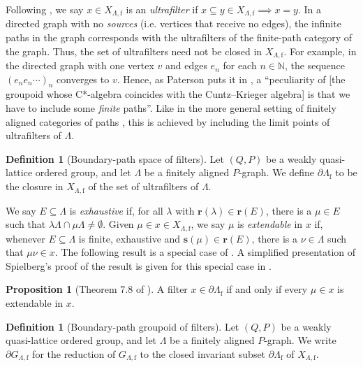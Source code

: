 \documentclass[11pt]{amsart}
\theoremstyle{definition}
\numberwithin{thm}{section}
\numberwithin{equation}{section}
\newtheorem{definition}[thm]{Definition}
\newtheorem{proposition}[thm]{Proposition}
\newcommand{\Define}[1]{\emph{#1}}
\newcommand{\emphasis}[1]{\textit{#1}}
\newcommand{\N}{\mathbb{N}}
\newcommand{\range}{\mathbf{r}}
\newcommand{\source}{\mathbf{s}}
\newcommand{\F}{\mathrm{f}}
\newcommand{\PS}[2]{X_{#2, #1}}
\newcommand{\PG}[2]{{G_{#2, #1}}}
\newcommand{\BPS}[2]{\partial{#2}_{#1}}
\newcommand{\BPG}[2]{\partial\PG{#1}{#2}}
\begin{document}
Following \cite{BSV13}, we say $x \in \PS{\F}{\Lambda}$ is an \Define{ultrafilter} if $x \subseteq y \in \PS{\F}{\Lambda} \implies x = y$. 
In a directed graph with no \Define{sources} (i.e. vertices that receive no edges), the infinite paths in the graph corresponds with the ultrafilters of the finite-path category of the graph. 
Thus, the set of ultrafilters need not be closed in $\PS{\F}{\Lambda}$. 
For example, in the directed graph with one vertex $v$ and edges $e_n$ for each $n \in \N$, the sequence $(e_ne_n\cdots)_n$ converges to $v$.
Hence, as Paterson puts it in \cite{Pat02}, a ``peculiarity of [the groupoid whose C*-algebra coincides with the Cuntz--Krieger algebra] is that we have to include some \emphasis{finite} paths''. 
Like in the more general setting of finitely aligned categories of paths \cite[Page 729]{Spi12}, this is achieved by including the limit points of ultrafilters of $\Lambda$.

\begin{definition}[Boundary-path space of filters]
\label{def:BPSfilter}
Let $(Q, P)$ be a weakly quasi-lattice ordered group, and let $\Lambda$ be a finitely aligned $P$-graph.
We define $\BPS{\F}{\Lambda}$ to be the closure in $\PS{\F}{\Lambda}$ of the set of ultrafilters of $\Lambda$.
\end{definition}

We say $E \subseteq \Lambda$ is \Define{exhaustive}\label{def:exhaustive} if, for all $\lambda$ with $\range(\lambda) \in \range(E)$, there is a $\mu \in E$ such that $\lambda\Lambda \cap \mu\Lambda \neq \emptyset$.
Given $\mu \in x \in \PS{\F}{\Lambda}$, we say $\mu$ is \Define{extendable}\label{def:extendable} in $x$ if, whenever $E \subseteq \Lambda$ is finite, exhaustive and $\source(\mu) \in \range(E)$, there is a $\nu \in \Lambda$ such that $\mu\nu \in x$.
The following result is a special case of \cite[Theorem 7.8]{Spi14}.
A simplified presentation of Spielberg's proof of the result is given for this special case in \cite[\S 5.4.1]{Jon24}.

\begin{proposition}[Theorem 7.8 of \cite{Spi14}]
A filter $x \in \BPS{\F}{\Lambda}$ if and only if every $\mu \in x$ is extendable in $x$.   
\end{proposition}

\begin{definition}[Boundary-path groupoid of filters]
\label{def:BPGfilter}
Let $(Q, P)$ be a weakly quasi-lattice ordered group, and let $\Lambda$ be a finitely aligned $P$-graph.
We write $\BPG{\F}{\Lambda}$ for the reduction of $\PG{\F}{\Lambda}$ to the closed invariant subset $\BPS{\F}{\Lambda}$ of $\PS{\F}{\Lambda}$.
\end{definition}
\end{document}

